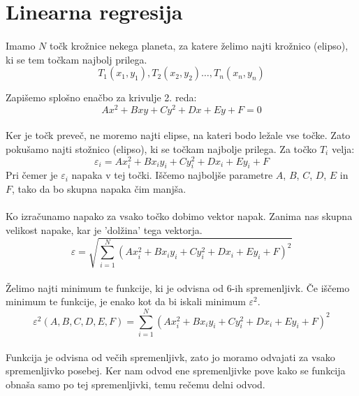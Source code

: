 \documentclass[a4paper, 12pt]{article}
\begin{document}
	\section*{Linearna regresija}
	\paragraph{}
	Imamo $N$ točk krožnice nekega planeta, za katere želimo najti krožnico (elipso), ki se tem točkam najbolj prilega.
	$$T_1(x_1, y_1), T_2(x_2, y_2) \ldots, T_n(x_n, y_n)$$

	Zapišemo splošno enačbo za krivulje 2. reda:
	$$Ax^2 + Bxy + Cy^2 + Dx + Ey + F = 0$$
	
	\paragraph{}
	Ker je točk preveč, ne moremo najti elipse, na kateri bodo ležale vse točke. Zato pokušamo najti stožnico (elipso), ki se točkam najbolje prilega. Za točko $T_i$ velja:
	$$\varepsilon_i = Ax_i^2 + Bx_iy_i + Cy_i^2 + Dx_i + Ey_i + F$$
	Pri čemer je $\varepsilon_i$ napaka v tej točki. Iščemo najboljše parametre $A$, $B$, $C$, $D$, $E$ in $F$, tako da bo skupna napaka čim manjša.
	
	\paragraph{}
	Ko izračunamo napako za vsako točko dobimo vektor napak. Zanima nas skupna velikost napake, kar je 'dolžina' tega vektorja.
	$$\varepsilon = \sqrt{\sum_{i=1}^{N} (Ax_i^2 + Bx_iy_i + Cy_i^2 + Dx_i + Ey_i + F)^2}$$
	
	\paragraph{}
	Želimo najti minimum te funkcije, ki je odvisna od 6-ih spremenljivk. Če iščemo minimum te funkcije, je enako kot da bi iskali minimum $\varepsilon^{2}$.
	$$\varepsilon^2(A, B, C, D, E, F) = \sum_{i=1}^{N} (Ax_i^2 + Bx_iy_i + Cy_i^2 + Dx_i + Ey_i + F)^2$$
	
	\paragraph{}
	Funkcija je odvisna od večih spremenljivk, zato jo moramo odvajati za vsako spremenljivko posebej. Ker nam odvod ene spremenljivke pove kako se funkcija obnaša samo po tej spremenljivki, temu rečemu delni odvod.
	
\end{document}
